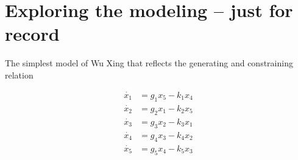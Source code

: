\documentclass{article}
\begin{document}
\section{Exploring the modeling -- just for record}
The simplest model of Wu Xing that reflects the generating and constraining relation

\begin{equation}
\begin{array}{rl}
\dot{x_1} &= g_1x_5 - k_1 x_4 \\
\dot{x_2} &= g_2 x_1 - k_2 x_5 \\
\dot{x_3} &= g_3 x_2 - k_3 x_1 \\
\dot{x_4} &= g_4 x_3 - k_4 x_2 \\
\dot{x_5} &= g_5 x_4  - k_5 x_3  
\end{array}
\end{equation}
\end{document}
